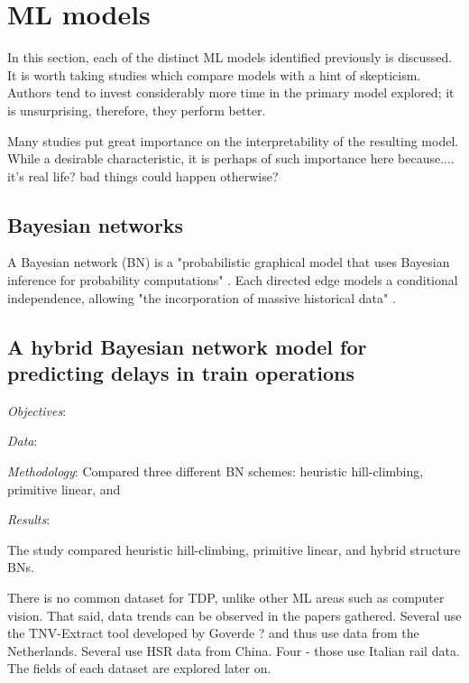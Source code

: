 \documentclass{article}
\begin{document}
\clearpage
\section{ML models}

In this section, each of the distinct ML models identified previously is discussed. It is worth taking studies which compare models with a hint of skepticism. Authors tend to invest considerably more time in the primary model explored; it is unsurprising, therefore, they perform better.

Many studies put great importance on the interpretability of the resulting model. While a desirable characteristic, it is perhaps of such importance here because.... it's real life? bad things could happen otherwise?


\subsection{Bayesian networks}

A Bayesian network (BN) is a "probabilistic graphical model that uses Bayesian inference for probability computations" \cite{towards_data_science_BN_intro}. Each directed edge models a conditional independence, allowing "the incorporation of massive historical data" \cite{lessan_fu_wen_2019}.

\subsection{A hybrid Bayesian network model for predicting delays in train operations \cite{lessan_fu_wen_2019}}

\textit{Objectives}: 

\textit{Data}:

\textit{Methodology}: Compared three different BN schemes: heuristic hill-climbing, primitive linear, and 

\textit{Results}:

The study compared heuristic hill-climbing, primitive linear, and hybrid structure BNs.

There is no common dataset for TDP, unlike other ML areas such as computer vision. That said, data trends can be observed in the papers gathered. Several use the TNV-Extract tool developed by Goverde ? and thus use data from the Netherlands. Several use HSR data from China. Four - those use Italian rail data. The fields of each dataset are explored later on. 
\end{document}
